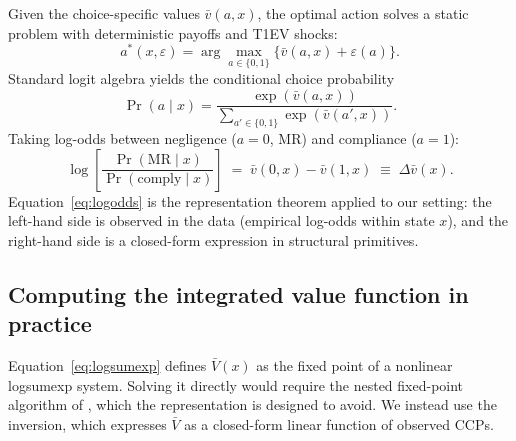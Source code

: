 Given the choice-specific values $\bar v(a, x)$, the optimal action solves a
static problem with deterministic payoffs and T1EV shocks:
\begin{equation*}
a^*(x, \varepsilon) = \arg\max_{a \in \{0,1\}}
\big\{ \bar v(a, x) + \varepsilon(a) \big\}.
\end{equation*}
Standard logit algebra \citep[Ch.~3]{train2009discrete} yields the conditional
choice probability
\begin{equation}
\Pr(a \mid x) = \frac{\exp\!\left( \bar v(a, x) \right)}
{\sum_{a' \in \{0, 1\}} \exp\!\left( \bar v(a', x) \right)}.
\label{eq:ccp}
\end{equation}
Taking log-odds between negligence ($a = 0$, MR) and compliance ($a = 1$):
\begin{equation}
\boxed{\;
\log \!\left[ \frac{\Pr(\text{MR} \mid x)}{\Pr(\text{comply} \mid x)} \right]
\;=\; \bar v(0, x) - \bar v(1, x)
\;\equiv\; \Delta \bar v(x).
\;}
\label{eq:logodds}
\end{equation}
Equation~\eqref{eq:logodds} is the \citet{hotz1993conditional} representation
theorem applied to our setting: the left-hand side is observed in the data
(empirical log-odds within state $x$), and the right-hand side is a closed-form
expression in structural primitives.

\subsection{Computing the integrated value function in practice}
\label{sec:vbar_computation}

Equation~\eqref{eq:logsumexp} defines $\bar V(x)$ as the fixed point of a
nonlinear logsumexp system. Solving it directly would require the nested
fixed-point algorithm of \citet{rust1987optimal}, which the
\citet{hotz1993conditional} representation is designed to avoid. We instead
use the \citet{arcidiaconomiller2011} inversion, which expresses $\bar V$ as a
closed-form linear function of observed CCPs.

